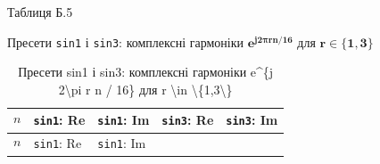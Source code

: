 \documentclass[
]{article}
\newcommand{\passthrough}[1]{#1}
\begin{document}
Таблиця Б.5

Пресети \passthrough{\lstinline!sin!}\passthrough{\lstinline!1!} і
\passthrough{\lstinline!sin!}\passthrough{\lstinline!3!}: комплексні
гармоніки \(\mathbf{e}^{\mathbf{j2\pi rn}\mathbf{/}\mathbf{16}}\) для
\(\mathbf{r}\mathbf{\in \{}\mathbf{1}\mathbf{,}\mathbf{3}\mathbf{\}}\)

\begin{longtable}[]{@{}
  >{\raggedright\arraybackslash}p{}
  >{\raggedright\arraybackslash}p{}
  >{\raggedright\arraybackslash}p{}
  >{\raggedright\arraybackslash}p{}
  >{\raggedright\arraybackslash}p{}@{}}
\caption[Пресети sin1 і sin3: комплексні гармоніки e\^{}\{j
2\textbackslash pi r n / 16\} для r \textbackslash in
\textbackslash\{1,3\textbackslash\}]{Пресети sin1 і sin3: комплексні
гармоніки e\^{}\{j 2\textbackslash pi r n / 16\} для r \textbackslash in
\textbackslash\{1,3\textbackslash\}}\tabularnewline
\toprule\noalign{}
\begin{minipage}[b]{\linewidth}\raggedright
\[n\]
\end{minipage} & \begin{minipage}[b]{\linewidth}\raggedright
\passthrough{\lstinline!sin1!}: Re
\end{minipage} & \begin{minipage}[b]{\linewidth}\raggedright
\passthrough{\lstinline!sin1!}: Im
\end{minipage} & \begin{minipage}[b]{\linewidth}\raggedright
\passthrough{\lstinline!sin3!}: Re
\end{minipage} & \begin{minipage}[b]{\linewidth}\raggedright
\passthrough{\lstinline!sin3!}: Im
\end{minipage} \\
\midrule\noalign{}
\endfirsthead
\toprule\noalign{}
\begin{minipage}[b]{\linewidth}\raggedright
\[n\]
\end{minipage} & \begin{minipage}[b]{\linewidth}\raggedright
\passthrough{\lstinline!sin1!}: Re
\end{minipage} & \begin{minipage}[b]{\linewidth}\raggedright
\passthrough{\lstinline!sin1!}: Im
\end{minipage} & \begin{minipage}[b]{\linewidth}\raggedright

\end{minipage}
\end{longtable}
\end{document}

